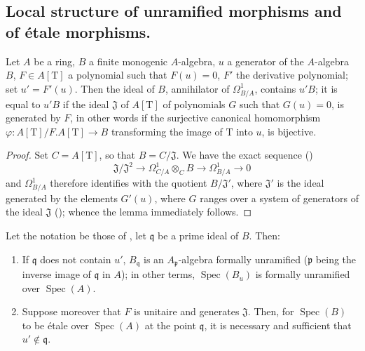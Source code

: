 \subsection{Local structure of unramified morphisms and of \'etale morphisms.}
\label{subsection:IV.18.4}


\begin{lemma}[18.4.1]
\label{IV.18.4.1}
Let $A$ be a ring, $B$ a finite monogenic $A$-algebra, $u$ a generator of the $A$-algebra $B$, $F\in A[\mathrm{T}]$ a polynomial such that $F(u)=0$, $F'$ the derivative polynomial;
set $u'=F'(u)$.
Then the ideal of $B$, annihilator of $\Omega^1_{B/A}$, contains $u'B$;
it is equal to $u'B$ if the ideal $\mathfrak{J}$ of $A[\mathrm{T}]$ of polynomials $G$ such that $G(u)=0$, is generated by $F$, in other words if the surjective canonical homomorphism $\varphi:A[\mathrm{T}]/F.A[\mathrm{T}]\to B$ transforming the image of $\mathrm{T}$ into $u$, is bijective.
\end{lemma}

\begin{proof}
Set $C=A[\mathrm{T}]$, so that $B=C/\mathfrak{J}$.
We have the exact sequence ()
\[
\mathfrak{J}/\mathfrak{J}^2\to\Omega^1_{C/A}\otimes_C B\to\Omega^1_{B/A}\to 0
\]
and $\Omega^1_{B/A}$ therefore identifies with the quotient $B/\mathfrak{J}'$, where $\mathfrak{J}'$ is the ideal generated by the elements $G'(u)$, where $G$ ranges over a system of generators of the ideal $\mathfrak{J}$ ();
whence the lemma immediately follows.
\end{proof}

\begin{proposition}[18.4.2]
\label{IV.18.4.2}
Let the notation be those of , let $\mathfrak{q}$ be a prime ideal of $B$.
Then:
\begin{enumerate}
  \item[(i)] If $\mathfrak{q}$ does not contain $u'$, $B_\mathfrak{q}$ is an $A_\mathfrak{p}$-algebra formally unramified ($\mathfrak{p}$ being the inverse image of $\mathfrak{q}$ in $A$);
in other terms, $\operatorname{Spec}(B_u)$ is formally unramified over $\operatorname{Spec}(A)$.
  \item[(ii)] Suppose moreover that $F$ is unitaire and generates $\mathfrak{J}$.
Then, for $\operatorname{Spec}(B)$ to be \'etale over $\operatorname{Spec}(A)$ at the point $\mathfrak{q}$, it is necessary and sufficient that $u'\notin\mathfrak{q}$.
\end{enumerate}
\end{proposition}

